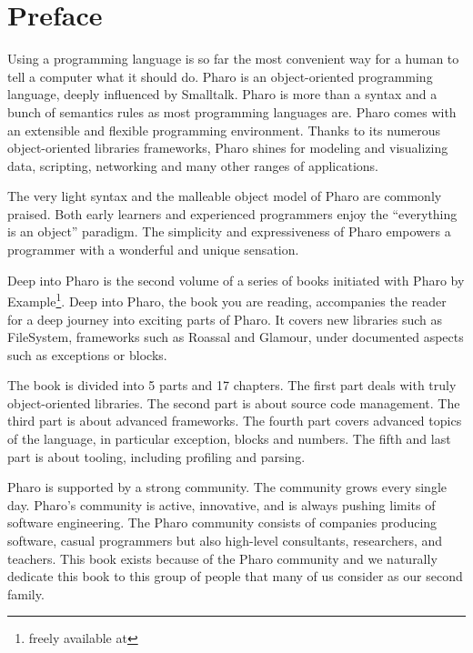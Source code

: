 \documentclass[a4paper,10pt,twoside]{book}
\begin{document}
	\sloppy
	\frontmatter
\fi
\chapter{Preface}

Using a programming language is so far the most convenient way for a human to tell  a computer what it should do. Pharo is an object-oriented programming language, deeply influenced by Smalltalk. Pharo is more than a syntax and a bunch of semantics rules as most programming languages are. Pharo comes with an extensible and flexible programming environment. Thanks to its numerous object-oriented libraries frameworks, Pharo shines for modeling and visualizing data, scripting, networking and many other ranges of applications.

The very light syntax and the malleable object model of Pharo are commonly praised. Both early learners and experienced programmers enjoy the ``everything is an object'' paradigm. The simplicity and expressiveness of Pharo empowers a programmer with a wonderful and unique sensation. 

Deep into Pharo is the second volume of a series of books initiated with Pharo by Example\footnote{freely available at }. 
Deep into Pharo, the book you are reading, accompanies the reader for a deep journey into exciting parts of Pharo. It covers new libraries such as FileSystem, frameworks such as Roassal and Glamour, under documented aspects such as exceptions or blocks. 

The book is divided into 5 parts and 17 chapters. The first part deals with truly object-oriented libraries. The second part is about source code management. The third part is about advanced frameworks. The fourth part covers advanced topics of the language, in particular exception, blocks and numbers. The fifth and last part is about tooling, including profiling and parsing.


Pharo is supported by a strong community. The community grows every single day. Pharo's community is active, innovative, and is always pushing limits of software engineering. The Pharo community consists of companies producing software, casual programmers but also high-level consultants, researchers, and teachers.
This book exists because of the Pharo community and we naturally dedicate this book to this group of people that many of us consider as our second family.
\end{document}
